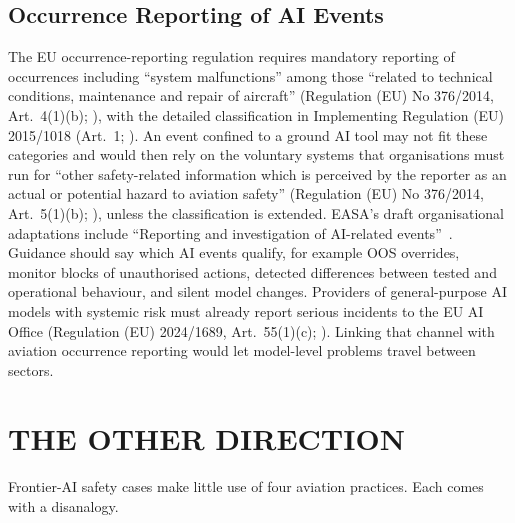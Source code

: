 \documentclass{aer}
\begin{document}
\subsection{Occurrence Reporting of AI Events}\label{sec:reporting}

The EU occurrence-reporting regulation requires mandatory reporting of occurrences including ``system malfunctions'' among those ``related to technical conditions, maintenance and repair of aircraft'' (Regulation (EU) No 376/2014, Art.~4(1)(b); \citealp{eu2014occurrence}), with the detailed classification in Implementing Regulation (EU) 2015/1018 (Art.~1; \citealp{eu2015occurrencelist}). An event confined to a ground AI tool may not fit these categories and would then rely on the voluntary systems that organisations must run for ``other safety-related information which is perceived by the reporter as an actual or potential hazard to aviation safety'' (Regulation (EU) No 376/2014, Art.~5(1)(b); \citealp{eu2014occurrence}), unless the classification is extended. EASA's draft organisational adaptations include ``Reporting and investigation of AI-related events''~\citeyearpar[slide~26]{easa2026aidays}. Guidance should say which AI events qualify, for example OOS overrides, monitor blocks of unauthorised actions, detected differences between tested and operational behaviour, and silent model changes. Providers of general-purpose AI models with systemic risk must already report serious incidents to the EU AI Office (Regulation (EU) 2024/1689, Art.~55(1)(c); \citealp{euaiact2024}). Linking that channel with aviation occurrence reporting would let model-level problems travel between sectors.

\section{THE OTHER DIRECTION}\label{sec:otherdirection}

Frontier-AI safety cases make little use of four aviation practices. Each comes with a disanalogy.
\end{document}
